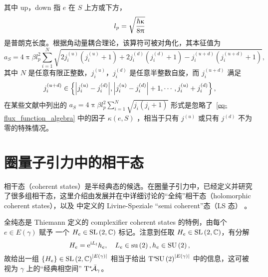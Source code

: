 		其中 up，down 指 $e$ 在 $S$ 上方或下方，
		\begin{equation}
			l_p = \sqrt{\frac{\hbar \upkappa}{8\uppi}}
		\end{equation}
		是普朗克长度。根据角动量耦合理论，该算符可被对角化，其本征值为
		\begin{equation}
			a_S = 4\uppi \beta l_p^2 \sum_{i=1}^N \sqrt{2j^{(u)}_i(j^{(u)}_i+1) + 2j^{(d)}_i(j^{(d)}_i+1) - j^{(u+d)}_i(j^{(u+d)}_i+1)},
		\end{equation}
		其中 $N$ 是任意有限正整数，$j^{(u)}_i$，$j^{(d)}_i$ 是任意半整数自旋，而 $j^{(u+d)}_i$ 满足
		\begin{equation}
			j^{(u+d)}_i \in \left\{ \abs{j^{(u)}_i - j^{(d)}_i}, \abs{j^{(u)}_i - j^{(d)}_i} + 1, \cdots , j^{(u)}_i + j^{(d)}_i \right\},
		\end{equation}
		在某些文献中列出的 $a_S = 4\uppi \beta l_p^2 \sum_{i=1}^N \sqrt{j_i(j_i+1)}$ 形式是忽略了~\eqref{eq-flux_function_algebra} 中的因子 $\kappa(e,S)$ ，相当于只有 $j^{(u)}$ 或只有 $j^{(d)}$ 不为零的特殊情况。

	\section{圈量子引力中的相干态}

		\label{sec-coherent_states}
		相干态（coherent states）是半经典态的候选。在圈量子引力中，已经定义并研究了很多组相干态，这里介绍由\cite{Thiemann2002,Ashtekar1994nx,Flori2009,Bahr2007}发展并在\cite{Bianchi2009}中详细讨论的“全纯”相干态（holomorphic coherent states），以及\cite{Livine2007} 中定义的 Livine-Speziale “semi coherent”态（LS 态）
		。

		全纯态是 Thiemann 定义的 complexifier coherent states 的特例，由每个 $e\in E(\gamma)$ 赋予 一个 $H_e \in \mathrm{SL}\left( 2,\mathbb{C} \right)$ 标记。注意到任取 $H_e\in \mathrm{SL}\left( 2,\mathbb{C} \right)$，有分解
		\begin{equation}
			H_e = \e{\ii L_l} h_e \qc L_e\in \su{2}, h_e\in \SU{2},
		\end{equation}
		故给出一组 $\{H_e\}\in \mathrm{SL}\left( 2,\mathbb{C} \right)^{\abs{E(\gamma)}}$ 相当于给出 $\mathrm{T}^*_{{}}\!{\mathrm{SU}\left(2\right)^{\abs{E(\gamma)}}}$ 中的信息，这可被视为 $\gamma$ 上的“经典相空间” $\mathrm{T}^*_{{}}\!{\bar{\mathcal{A}}_\gamma}$。

